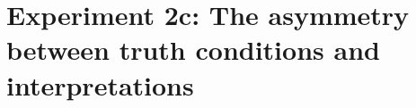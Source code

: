 \documentclass[12pt,letterpaper]{article}
\newcommand{\ndg}[1]{\textcolor{Green}{[ndg: #1]}}
\begin{document}
%

\section*{Experiment 2c: The asymmetry between truth conditions and interpretations} 
\end{document}
